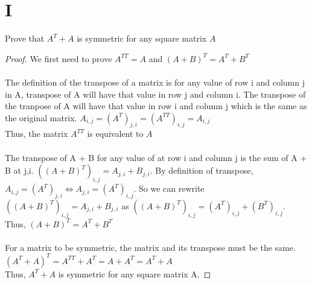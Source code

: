 \documentclass[11pt]{scrartcl}
\begin{document}
\section{I}
Prove that $A^T + A$ is symmetric for any square matrix $A$
\begin{proof}
	We first need to prove $A^{TT} = A $ and $(A + B)^T = A^T + B^T$\\
	\-\\
	The definition of the transpose of a matrix is for any value of row i and column j in A, transpose of A will have that value in row j and column i. The transpose of the tranpose of A will have that value in row i and column j which is the same as the original matrix.   
	$A_{i,j} = (A^T)_{j,i} = (A^{TT})_{i,j} = A_{i,j}$\\
	Thus, the matrix $A^{TT}$ is equivalent to $A$ \\
	\-\\
	The transpose of A + B for any value of at row i and column j is the sum of A + B at j,i. $((A + B)^T)_{i,j} = A_{j,i} + B_{j,i}$. By definition of transpose, $A_{i,j} = (A^{T})_{j,i} \Leftrightarrow A_{j,i} = (A^{T})_{i,j}$. So we can rewrite $((A + B)^T)_{i,j} = A_{j,i} + B_{j,i}$ as $((A + B)^T)_{i,j} = (A^T)_{i,j} + (B^T)_{i,j}$.\\
	Thus, $(A + B)^T = A^T + B^T$\\
	\-\\
	For a matrix to be symmetric, the matrix and its transpose must be the same. \\
	$(A^T + A)^T = A^{TT} + A^T = A + A^T = A^T + A$\\
	Thus, $A^T + A$ is symmetric for any square matrix A.
\end{proof}
\end{document}
